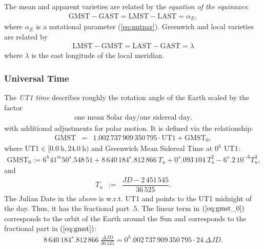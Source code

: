 \documentclass [12pt, a4paper] {article}
\begin{document}
The mean and apparent varieties are related by the \emph{equation of the equinoxes}:
\begin {eqnarray}
  \label{eq:equinoxes}
  \textrm{GMST} - \textrm{GAST} = \textrm{LMST} - \textrm{LAST} = \alpha_E,
\end {eqnarray}
where $\alpha_E$ is a nutational parameter (\ref{eq:nutpar}). Greenwich and local 
varieties are related by 
\begin {eqnarray}
  \textrm{LMST} - \textrm{GMST} = \textrm{LAST} - \textrm{GAST} = \lambda
\end {eqnarray}
where $\lambda$ is the east longitude of the local meridian.

\subsubsection{Universal Time}
The \emph{UT1 time} describes roughly the rotation angle of the Earth scaled by the factor
\begin {eqnarray}
  \textrm{one mean Solar day} / \textrm{one sidereal day}.
\end {eqnarray}
with additional adjustments for polar motion. It is defined via the relationship:
\begin {eqnarray}
\label{eq:gmst}
\textrm{GMST} &=& 1.002\,737\,909\,350\,795\cdot\textrm{UT1} + \textrm{GMST}_0,
\end {eqnarray}
where UT1$\in[0.0\:\textrm{h}, 24.0\:\textrm{h})$ and Greenwich Mean Sidereal Time at 
$0^h$ UT1:
\begin {eqnarray}
  \label{eq:gmst_0}
  \textrm{GMST}_0 := 6^h41^m50^s.548\,51 + 8\,640\,184^s.812\,866\:T_u + 
  0^s.093\,104\:T_u^2 - 6^s.2\,10^{-6}T_u^3,
\end {eqnarray}
and 
\begin {eqnarray}
  T_u &:=& \dfrac{JD - 2\,451\,545}{36\,525}.
\end {eqnarray}
The Julian Date in the above is w.r.t. UT1 and points to the UT1 midnight of the day. 
Thus, it has the fractional part $.5$.
The linear term in $(\ref{eq:gmst_0})$ corresponds to the orbit of the Earth around the 
Sun and corresponds to the fractional part in $(\ref{eq:gmst})$:
\begin {eqnarray}
  8\,640\,184^s.812\,866 \:\frac{\Delta JD}{36\,525} 
  = 0^h.002\,737\,909\,350\,795\cdot 24\:\Delta JD.
\end {eqnarray}

\end{document}
